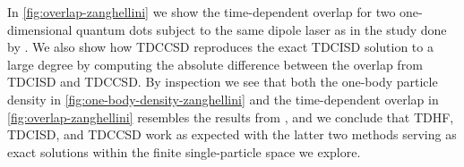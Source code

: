         In \autoref{fig:overlap-zanghellini} we show the
        time-dependent overlap for two one-dimensional quantum dots subject
        to the same dipole laser as in the study done by
        \citeauthor{zanghellini_2004} \cite{zanghellini_2004}.
        We also show how TDCCSD reproduces the exact TDCISD solution to a large
        degree by computing the absolute difference between the overlap from
        TDCISD and TDCCSD.
        By inspection we see that both the one-body particle density in
        \autoref{fig:one-body-density-zanghellini} and the time-dependent
        overlap in \autoref{fig:overlap-zanghellini} resembles the results from
        \citeauthor{zanghellini_2004} \cite{zanghellini_2004}, and we conclude
        that TDHF, TDCISD, and TDCCSD work as expected with the latter two
        methods serving as exact solutions within the finite single-particle
        space we explore.

